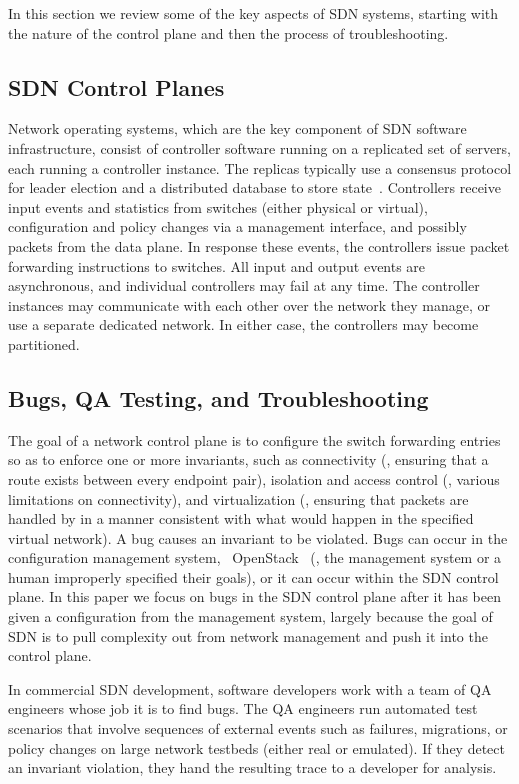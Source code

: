 In this section we review some of the key aspects of SDN systems, starting with the nature of the control plane and then the process of troubleshooting.

\subsection{SDN Control Planes}
Network operating systems, which are the key component of SDN software
infrastructure, consist of controller software running on a replicated set of
servers, each running a controller instance. The replicas typically use a
consensus protocol for leader election and a distributed database to store
state~\cite{onix}. Controllers receive input events and
statistics from switches (either physical or virtual), configuration and
policy changes via a management interface, and possibly packets from the data
plane. In response these events, the
controllers issue packet forwarding instructions to switches. All input
and output events are asynchronous, and individual controllers may fail at any
time. The controller instances may communicate
with each other over the network they manage, or use a separate dedicated
network. In either case, the controllers may become partitioned.

\subsection{Bugs, QA Testing, and Troubleshooting}
The goal of a network control plane is to configure the switch forwarding entries so as to
enforce one or more invariants, such as connectivity (\ie, ensuring that a
route exists between every endpoint pair), isolation and access control (\ie, various limitations on
connectivity), and virtualization (\ie, ensuring that packets are handled by
in a manner consistent with what would happen in the specified virtual
network). A bug causes an invariant to be violated. Bugs can occur in the
configuration management system, \eg~OpenStack~\cite{quantum} (\ie, the
management system or a human improperly specified their goals), or it
can occur within the SDN control plane. In this paper we focus on bugs in the
SDN control plane after it has been given a configuration from the management
system, largely because the goal of SDN is to pull complexity out from network management
and push it into the control plane.

In commercial SDN development, software developers work with a team of QA engineers whose
job it is to find bugs. The QA engineers run automated test scenarios that involve
sequences of external events such as failures, migrations, or policy changes
on large network testbeds (either real or emulated).
If they detect an invariant violation, they hand the resulting trace to a developer for analysis.

